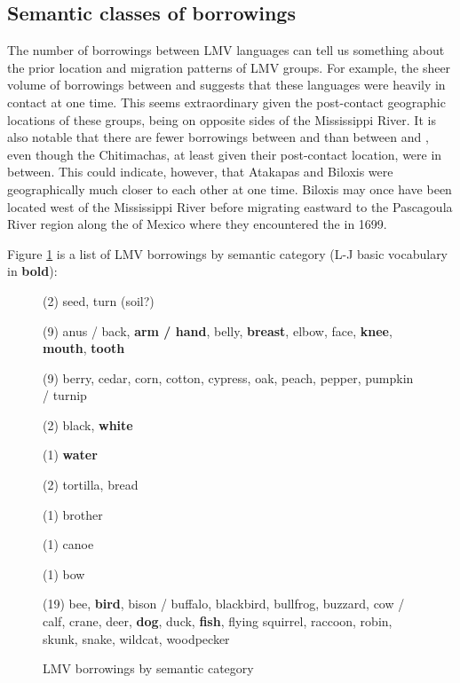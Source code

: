 \documentclass[output=paper]{LSP/langsci}
\begin{document}
\subsection{Semantic classes of borrowings}
	
	The number of borrowings between LMV languages can tell us something about the prior location and migration patterns of LMV groups. For example, the sheer volume of borrowings between  and  suggests that these languages were heavily in contact at one time. This seems extraordinary given the post-contact geographic locations of these groups, being on opposite sides of the Mississippi River. It is also notable that there are fewer borrowings between  and  than between  and , even though the Chitimachas, at least given their post-contact location, were in between. This could indicate, however, that Atakapas and Biloxis were geographically much closer to each other at one time. Biloxis may once have been located west of the Mississippi River before migrating eastward to the Pascagoula River region along the  of Mexico where they encountered the  in 1699.

	Figure \ref{LMVloans} is a list of LMV borrowings by semantic category (L-J basic vocabulary in \textbf{bold}): 

\begin{figure}[]
\caption{LMV borrowings by semantic category}
\begin{description} \itemsep1pt \parskip0pt 
\item[Agricultural:] (2) seed, turn (soil?)
\item[Body parts:] (9) anus / back, \textbf{arm / hand}, belly, \textbf{breast}, elbow, face, \textbf{knee}, \textbf{mouth}, \textbf{tooth}
\item[Botanical:] (9) berry, cedar, corn, cotton, cypress, oak, peach, pepper, pumpkin / turnip
\item[Color:] (2) black, \textbf{white}
\item[Drink:] (1) \textbf{water}
\item[Food:] (2) tortilla, bread
\item[Kin:] (1) brother
\item[Transport:] (1) canoe
\item[Weapon:] (1) bow
\item[Zoological:] (19) bee, \textbf{bird}, bison / buffalo, blackbird, bullfrog, buzzard, cow / calf, crane, deer, \textbf{dog}, duck, \textbf{fish}, flying squirrel, raccoon, robin, skunk, snake, wildcat, woodpecker
\end{description}
\label{LMVloans}
\end{figure}
\end{document}
